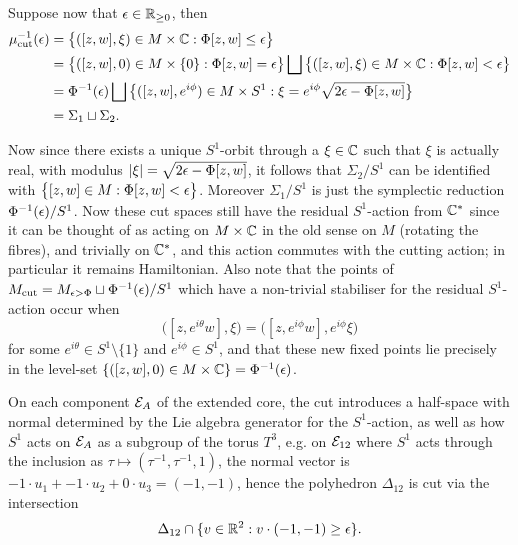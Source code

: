 Suppose now that $\epsilon \in \mathbb{R}_{\geq 0}$, then
\begin{equation*}
	\begin{split}
		\mu_{\text{cut}}^{-1}(\epsilon) &= \big\{ ([z,w],\xi) \in M \times \mathbb{C} : \Phi[z,w] \leq \epsilon \big\} \\
		&= \big\{ ([z,w], 0) \in M \times \{0\} : \Phi[z,w] = \epsilon \big\} \bigsqcup \big\{ ([z,w], \xi) \in M \times \mathbb{C} : \Phi[z,w] < \epsilon \big\} \\
		&= \Phi^{-1}(\epsilon) \bigsqcup \big\{ ([z,w], e^{i\phi}) \in M \times S^{1} : \xi = e^{i\phi}\sqrt{2\epsilon - \Phi[z,w]} \big\}\\
		&= \Sigma_{1} \sqcup \Sigma_{2}.
	\end{split}
\end{equation*}

Now since there exists a unique $S^{1}$-orbit through a $\xi \in \mathbb{C}$ such that $\xi$ is actually real, with modulus $|\xi| = \sqrt{2\epsilon - \Phi[z,w]}$, it follows that $\Sigma_{2}/S^{1}$ can be identified with $\big\{ [z,w] \in M : \Phi[z,w] < \epsilon \big\}$. Moreover $\Sigma_{1}/S^{1}$ is just the symplectic reduction $\Phi^{-1}(\epsilon)/S^{1}$. Now these cut spaces still have the residual $S^{1}$-action from $\mathbb{C}^{\ast}$ since it can be thought of as acting on $M \times \mathbb{C}$ in the old sense on $M$ (rotating the fibres), and trivially on $\mathbb{C}^{\ast}$, and this action commutes with the cutting action; in particular it remains Hamiltonian. Also note that the points of $M_{\text{cut}} = M_{\epsilon > \Phi} \sqcup \Phi^{-1}(\epsilon)/S^{1}$ which have a non-trivial stabiliser for the residual $S^{1}$-action occur when
$$
	\big( [z, e^{i\theta}w], \xi  \big) = \big( [z,e^{i\phi}w ], e^{i\phi}\xi \big)
$$
for some $e^{i\theta} \in S^{1} \setminus \{1\}$ and $e^{i\phi} \in S^{1}$, and that these new fixed points lie precisely in the level-set $\{ ([z,w], 0) \in M \times \mathbb{C} \} = \Phi^{-1}(\epsilon)$.

On each component $\mathcal{E}_{A}$ of the extended core, the cut introduces a half-space with normal determined by the Lie algebra generator for the $S^{1}$-action, as well as how $S^{1}$ acts on $\mathcal{E}_{A}$ as a subgroup of the torus $T^{3}$, e.g. on $\mathcal{E}_{12}$ where $S^{1}$ acts through the inclusion as $\tau \mapsto (\tau^{-1}, \tau^{-1}, 1)$, the normal vector is $-1\cdot u_{1} + -1\cdot u_{2} + 0\cdot u_{3} = (-1,-1)$, hence the polyhedron $\Delta_{12}$ is cut via the intersection
$$
	\Delta_{12} \cap \{ v\in \mathbb{R}^{2} : v \cdot (-1,-1) \geq \epsilon \}.
$$

